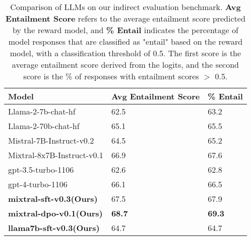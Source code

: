 \begin{table}[htbp!]
\centering
\begin{tabular}{ p{6cm}|p{4cm}|p{2cm}}
 \toprule
 \textbf{Model} & \textbf{Avg Entailment Score} & \textbf{\% Entail} \\
 \midrule
 Llama-2-7b-chat-hf & 62.5 & 63.2\\
 \midrule 
 Llama-2-70b-chat-hf & 65.1 & 65.5 \\
 \midrule
 Mistral-7B-Instruct-v0.2 & 64.5 & 65.2\\
 \midrule
 Mixtral-8x7B-Instruct-v0.1 & 66.9 & 67.6 \\
 \midrule
 gpt-3.5-turbo-1106 & 62.6 & 62.8 \\
 \midrule
 gpt-4-turbo-1106 & 66.1 & 66.5 \\
 \midrule
 \textbf{mixtral-sft-v0.3(Ours)} & 67.5 & 67.9 \\
 \midrule
 \textbf{mixtral-dpo-v0.1(Ours)} & \textbf{68.7} & \textbf{69.3}\\
 \midrule
 \textbf{llama7b-sft-v0.3(Ours)} & 64.7 & 64.7 \\
 \bottomrule
\end{tabular}
\caption{\label{tab: grounded eval} Comparison of LLMs on our indirect evaluation benchmark. \textbf{Avg Entailment Score} refers to the average entailment score predicted by the reward model, and \textbf{\% Entail} indicates the percentage of model responses that are classified as "entail" based on the reward model, with a classification threshold of 0.5. The first score is the average entailment score derived from the logits, and the second score is the \% of responses with entailment scores $>$ 0.5. 
}
\end{table}

